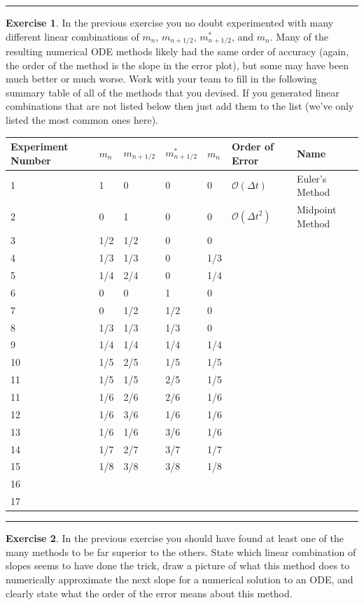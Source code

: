 \documentclass[
]{book}
\theoremstyle{definition}
\theoremstyle{definition}
\theoremstyle{definition}
\newtheorem{exercise}{Exercise}[chapter]
\theoremstyle{remark}
\begin{document}
\begin{center}\rule{0.5\linewidth}{0.5pt}\end{center}

\begin{exercise}
\protect\hypertarget{exr:unnamed-chunk-454}{}{\label{exr:unnamed-chunk-454} }In the previous exercise you no doubt experimented with many different linear combinations of \(m_n\), \(m_{n+1/2}\), \(m_{n+1/2}^*\), and \(m_n\). Many of the resulting numerical ODE methods likely had the same order of accuracy (again, the order of the method is the slope in the error plot), but some may have been much better or much worse. Work with your team to fill in the following summary table of all of the methods that you devised. If you generated linear combinations that are not listed below then just add them to the list (we've only listed the most common ones here).

\begin{longtable}[]{@{}lllllll@{}}
\toprule
Experiment Number & \(m_n\) & \(m_{n+1/2}\) & \(m_{n+1/2}^*\) & \(m_n\) & Order of Error & Name\tabularnewline
\midrule
\endhead
1 & 1 & 0 & 0 & 0 & \(\mathcal{O}(\Delta t)\) & Euler's Method\tabularnewline
2 & 0 & 1 & 0 & 0 & \(\mathcal{O}(\Delta t^2)\) & Midpoint Method\tabularnewline
3 & 1/2 & 1/2 & 0 & 0 & &\tabularnewline
4 & 1/3 & 1/3 & 0 & 1/3 & &\tabularnewline
5 & 1/4 & 2/4 & 0 & 1/4 & &\tabularnewline
6 & 0 & 0 & 1 & 0 & &\tabularnewline
7 & 0 & 1/2 & 1/2 & 0 & &\tabularnewline
8 & 1/3 & 1/3 & 1/3 & 0 & &\tabularnewline
9 & 1/4 & 1/4 & 1/4 & 1/4 & &\tabularnewline
10 & 1/5 & 2/5 & 1/5 & 1/5 & &\tabularnewline
11 & 1/5 & 1/5 & 2/5 & 1/5 & &\tabularnewline
11 & 1/6 & 2/6 & 2/6 & 1/6 & &\tabularnewline
12 & 1/6 & 3/6 & 1/6 & 1/6 & &\tabularnewline
13 & 1/6 & 1/6 & 3/6 & 1/6 & &\tabularnewline
14 & 1/7 & 2/7 & 3/7 & 1/7 & &\tabularnewline
15 & 1/8 & 3/8 & 3/8 & 1/8 & &\tabularnewline
16 & & & & & &\tabularnewline
17 & & & & & &\tabularnewline
\bottomrule
\end{longtable}
\end{exercise}

\begin{center}\rule{0.5\linewidth}{0.5pt}\end{center}

\begin{exercise}
\protect\hypertarget{exr:unnamed-chunk-455}{}{\label{exr:unnamed-chunk-455} }In the previous exercise you should have found at least one of the many methods to be far superior to the others. State which linear combination of slopes seems to have done the trick, draw a picture of what this method does to numerically approximate the next slope for a numerical solution to an ODE, and clearly state what the order of the error means about this method.
\end{exercise}
\end{document}
